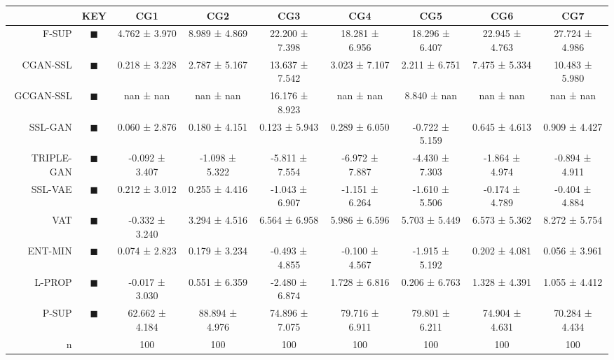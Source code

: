 \begin{tabular}{rcccccccc}
\toprule
 & KEY & CG1 & CG2 & CG3 & CG4 & CG5 & CG6 & CG7 \\
\midrule
F-SUP & \textcolor{FULLY_SUPERVISED_CLASSIFIER}{\LARGE $\blacksquare$} & 4.762 ± 3.970 & 8.989 ± 4.869 & 22.200 ± 7.398 & 18.281 ± 6.956 & 18.296 ± 6.407 & 22.945 ± 4.763 & 27.724 ± 4.986 \\
CGAN-SSL & \textcolor{CGAN_BASIC_DJ_SUPERVISED_CLASSIFIER}{\LARGE $\blacksquare$} & 0.218 ± 3.228 & 2.787 ± 5.167 & 13.637 ± 7.542 & 3.023 ± 7.107 & 2.211 ± 6.751 & 7.475 ± 5.334 & 10.483 ± 5.980 \\
GCGAN-SSL & \textcolor{CGAN_GUMBEL_DJ_SUPERVISED_CLASSIFIER}{\LARGE $\blacksquare$} & nan ± nan & nan ± nan & 16.176 ± 8.923 & nan ± nan & 8.840 ± nan & nan ± nan & nan ± nan \\
SSL-GAN & \textcolor{SSL_GAN}{\LARGE $\blacksquare$} & 0.060 ± 2.876 & 0.180 ± 4.151 & 0.123 ± 5.943 & 0.289 ± 6.050 & -0.722 ± 5.159 & 0.645 ± 4.613 & 0.909 ± 4.427 \\
TRIPLE-GAN & \textcolor{TRIPLE_GAN}{\LARGE $\blacksquare$} & -0.092 ± 3.407 & -1.098 ± 5.322 & -5.811 ± 7.554 & -6.972 ± 7.887 & -4.430 ± 7.303 & -1.864 ± 4.974 & -0.894 ± 4.911 \\
SSL-VAE & \textcolor{SSL_VAE}{\LARGE $\blacksquare$} & 0.212 ± 3.012 & 0.255 ± 4.416 & -1.043 ± 6.907 & -1.151 ± 6.264 & -1.610 ± 5.506 & -0.174 ± 4.789 & -0.404 ± 4.884 \\
VAT & \textcolor{VAT}{\LARGE $\blacksquare$} & -0.332 ± 3.240 & 3.294 ± 4.516 & 6.564 ± 6.958 & 5.986 ± 6.596 & 5.703 ± 5.449 & 6.573 ± 5.362 & 8.272 ± 5.754 \\
ENT-MIN & \textcolor{ENTROPY_MINIMISATION}{\LARGE $\blacksquare$} & 0.074 ± 2.823 & 0.179 ± 3.234 & -0.493 ± 4.855 & -0.100 ± 4.567 & -1.915 ± 5.192 & 0.202 ± 4.081 & 0.056 ± 3.961 \\
L-PROP & \textcolor{LABEL_PROPAGATION}{\LARGE $\blacksquare$} & -0.017 ± 3.030 & 0.551 ± 6.359 & -2.480 ± 6.874 & 1.728 ± 6.816 & 0.206 ± 6.763 & 1.328 ± 4.391 & 1.055 ± 4.412 \\
P-SUP & \textcolor{PARTIAL_SUPERVISED_CLASSIFIER}{\LARGE $\blacksquare$} & 62.662 ± 4.184 & 88.894 ± 4.976 & 74.896 ± 7.075 & 79.716 ± 6.911 & 79.801 ± 6.211 & 74.904 ± 4.631 & 70.284 ± 4.434 \\
n &  & 100 & 100 & 100 & 100 & 100 & 100 & 100 \\
\bottomrule
\end{tabular}
